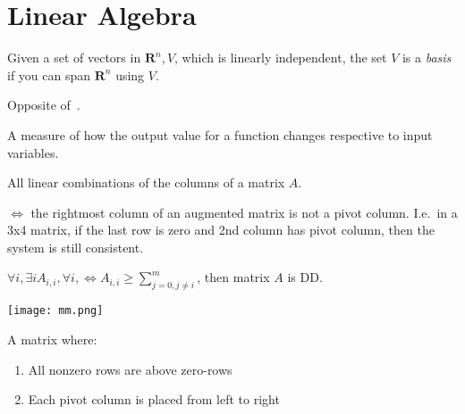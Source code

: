 \section{Linear Algebra}

\begin{definition}[Basis]
    Given a set of vectors in $\mathbf{R}^{n}, V$, which is linearly
    independent, the set $V$ is a \textit{basis} if you can span 
    $\mathbf{R}^{n}$ using $V$.
\end{definition}

\begin{definition}\label{backwardsubstituion}
    Opposite of~.
\end{definition}

\begin{definition}\label{conditionnumber}
    A measure of how the output value for a function changes respective to 
    input variables.
\end{definition}

\begin{definition}
    All linear combinations of the columns of a matrix $A$.
\end{definition}

\begin{definition}[Consistent]
    $\iff$ the rightmost column of an augmented matrix is not a pivot column.
    I.e.\ in a 3x4 matrix, if the last row is zero and 2nd column has pivot
    column, then the system is still consistent.
\end{definition}

\begin{definition}
    $\forall{i}, \exists{i} A_{i, i}, \forall i, \iff A_{i,i} 
    \geq \sum\limits_{j = 0, j\neq i}^{m}$,
    then matrix $A$ is DD.
\end{definition}

\begin{definition}
    \texttt{[image: mm.png]}
\end{definition}

\begin{definition}
    A matrix where:
    \begin{enumerate}
        \item All nonzero rows are above zero-rows
        \item Each pivot column is placed from left to right
    \end{enumerate}
\end{definition}


